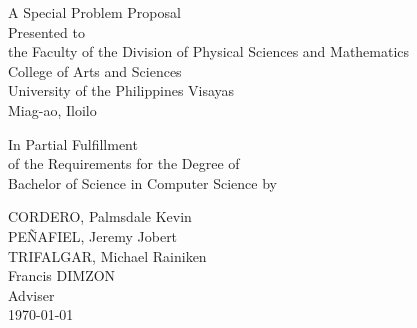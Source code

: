 \begin{titlepage}
\centering


\vspace{1.75cm}
A Special Problem Proposal\\
Presented to\\
the Faculty of the Division of Physical Sciences and Mathematics\\
College of Arts and Sciences\\
University of the Philippines Visayas\\
Miag-ao, Iloilo

\vspace{1.75cm}
In Partial Fulfillment\\
of the Requirements for the Degree of\\
Bachelor of Science in Computer Science
by\\
\vspace{1cm}


CORDERO, Palmsdale Kevin  \\
PEÑAFIEL, Jeremy Jobert  \\
TRIFALGAR, Michael Rainiken  \\

\vspace{1.75cm}
Francis DIMZON \\
Adviser\\

\vspace{1.25cm}
\today
\end{titlepage}
